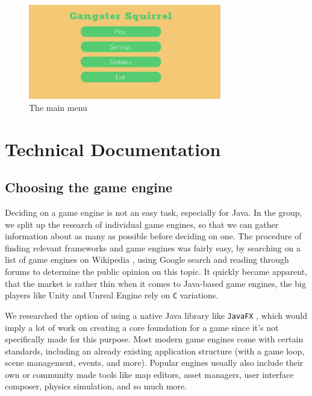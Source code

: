 \documentclass[12p]{article}
\begin{document}
\begin{figure}[ht]
  \center
  \includegraphics[width=0.75\textwidth]{Documentation/main_menu.png}
  \caption{The main menu}
  \label{fig:main_menu_screenshot}
\end{figure}


\clearpage
\section{Technical Documentation}

\subsection{Choosing the game engine} \label{DocGameEngine}

Deciding on a game engine is not an easy task, especially for Java. In the group, we split up the research of individual game engines, so that we can gather information about as many as possible before deciding on one. The procedure of finding relevant frameworks and game engines was fairly easy, by searching on a list of game engines on Wikipedia \cite{ListOfGameEngines}, using Google search and reading through forums to determine the public opinion on this topic. It quickly became apparent, that the market is rather thin when it comes to Java-based game engines, the big players like Unity \cite{UnityGameEngine} and Unreal Engine \cite{UnrealEngine} rely on \texttt{C} variations.

We researched the option of using a native Java library like \texttt{JavaFX} \cite{JavaFX}, which would imply a lot of work on creating a core foundation for a game since it's not specifically made for this purpose. Most modern game engines come with certain standards, including an already existing application structure (with a game loop, scene management, events, and more). Popular engines usually also include their own or community made tools like map editors, asset managers, user interface composer, physics simulation, and so much more.
\end{document}
